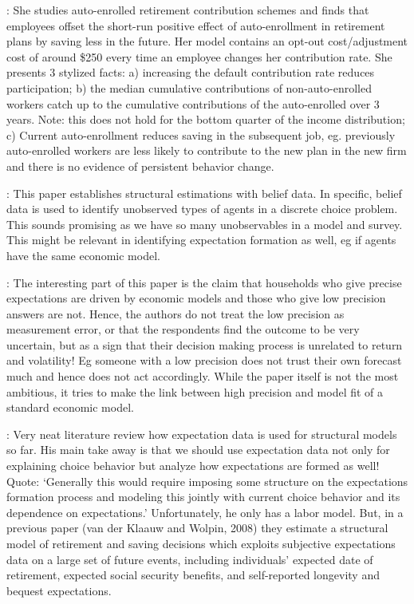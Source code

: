 \documentclass[ProjectABM]{subfiles}
\begin{document}
\cite{choukhmane_default_2021}: She studies auto-enrolled retirement contribution schemes and finds that employees offset the short-run positive effect of auto-enrollment in retirement plans by saving less in the future. Her model contains an opt-out cost/adjustment cost of around \$250 every time an employee changes her contribution rate.
She presents 3 stylized facts: a) increasing the default contribution rate reduces participation; b) the median cumulative contributions of non-auto-enrolled workers catch up to the cumulative contributions of the auto-enrolled over 3 years. Note: this does not hold for the bottom quarter of the income distribution; c) Current auto-enrollment reduces saving in the subsequent job, eg. previously auto-enrolled workers are less likely to contribute to the new plan in the new firm and there is no evidence of persistent behavior change.

\cite{PZ2013_expec}: This paper establishes structural estimations with belief data. In specific, belief data is used to identify unobserved types of agents in a discrete choice problem. This sounds promising as we have so many unobservables in a model and survey. This might be relevant in identifying expectation formation as well, eg if agents have the same economic model.

\cite{DEvG2017_subjective}:
The interesting part of this paper is the claim that households who give precise expectations are driven by economic models and those who give low precision answers are not. Hence, the authors do not treat the low precision as measurement error, or that the respondents find the outcome to be very uncertain, but as a sign that their decision making process is unrelated to return and volatility! Eg someone with a low precision does not trust their own forecast much and hence does not act accordingly. While the paper itself is not the most ambitious, it tries to make the link between high precision and model fit of a standard economic model. 

\cite{vanderKlaauw2012_expectation}: Very neat literature review how expectation data is used for structural models so far. His main take away is that we should use expectation data not only for explaining choice behavior but analyze how expectations are formed as well! Quote: ‘Generally this would require imposing some structure on the expectations formation process and modeling this jointly with current choice behavior and its dependence on expectations.’
Unfortunately, he only has a labor model. But, in a previous paper (van der Klaauw and Wolpin, 2008) they estimate a structural model of retirement and saving decisions which exploits subjective expectations data on a large set of future events, including individuals’ expected date of retirement, expected social security benefits, and self-reported longevity and bequest expectations.
\end{document}
